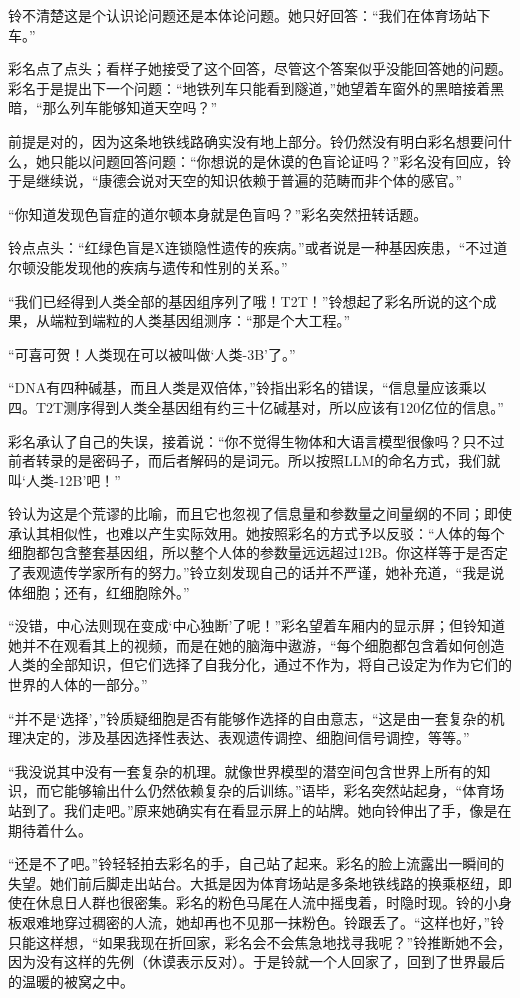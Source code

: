 铃不清楚这是个认识论问题还是本体论问题。她只好回答：“我们在体育场站下车。”

彩名点了点头；看样子她接受了这个回答，尽管这个答案似乎没能回答她的问题。彩名于是提出下一个问题：“地铁列车只能看到隧道，”她望着车窗外的黑暗接着黑暗，“那么列车能够知道天空吗？”

前提是对的，因为这条地铁线路确实没有地上部分。铃仍然没有明白彩名想要问什么，她只能以问题回答问题：“你想说的是休谟的色盲论证吗？”彩名没有回应，铃于是继续说，“康德会说对天空的知识依赖于普遍的范畴而非个体的感官。”

“你知道发现色盲症的道尔顿本身就是色盲吗？”彩名突然扭转话题。

铃点点头：“红绿色盲是X连锁隐性遗传的疾病。”或者说是一种基因疾患，“不过道尔顿没能发现他的疾病与遗传和性别的关系。”

“我们已经得到人类全部的基因组序列了哦！T2T！”铃想起了彩名所说的这个成果，从端粒到端粒的人类基因组测序：“那是个大工程。”

“可喜可贺！人类现在可以被叫做‘人类-3B’了。”

“DNA有四种碱基，而且人类是双倍体，”铃指出彩名的错误，“信息量应该乘以四。T2T测序得到人类全基因组有约三十亿碱基对，所以应该有120亿位的信息。”

彩名承认了自己的失误，接着说：“你不觉得生物体和大语言模型很像吗？只不过前者转录的是密码子，而后者解码的是词元。所以按照LLM的命名方式，我们就叫‘人类-12B’吧！”

铃认为这是个荒谬的比喻，而且它也忽视了信息量和参数量之间量纲的不同；即使承认其相似性，也难以产生实际效用。她按照彩名的方式予以反驳：“人体的每个细胞都包含整套基因组，所以整个人体的参数量远远超过12B。你这样等于是否定了表观遗传学家所有的努力。”铃立刻发现自己的话并不严谨，她补充道，“我是说体细胞；还有，红细胞除外。”

“没错，中心法则现在变成‘中心独断’了呢！”彩名望着车厢内的显示屏；但铃知道她并不在观看其上的视频，而是在她的脑海中遨游，“每个细胞都包含着如何创造人类的全部知识，但它们选择了自我分化，通过不作为，将自己设定为作为它们的世界的人体的一部分。”

“并不是‘选择’，”铃质疑细胞是否有能够作选择的自由意志，“这是由一套复杂的机理决定的，涉及基因选择性表达、表观遗传调控、细胞间信号调控，等等。”

“我没说其中没有一套复杂的机理。就像世界模型的潜空间包含世界上所有的知识，而它能够输出什么仍然依赖复杂的后训练。”语毕，彩名突然站起身，“体育场站到了。我们走吧。”原来她确实有在看显示屏上的站牌。她向铃伸出了手，像是在期待着什么。

\begin{branch}
\gutend “还是不了吧。”铃轻轻拍去彩名的手，自己站了起来。彩名的脸上流露出一瞬间的失望。她们前后脚走出站台。大抵是因为体育场站是多条地铁线路的换乘枢纽，即使在休息日人群也很密集。彩名的粉色马尾在人流中摇曳着，时隐时现。铃的小身板艰难地穿过稠密的人流，她却再也不见那一抹粉色。铃跟丢了。“这样也好，”铃只能这样想，“如果我现在折回家，彩名会不会焦急地找寻我呢？”铃推断她不会，因为没有这样的先例（休谟表示反对）。于是铃就一个人回家了，回到了世界最后的温暖的被窝之中。
\end{branch}

